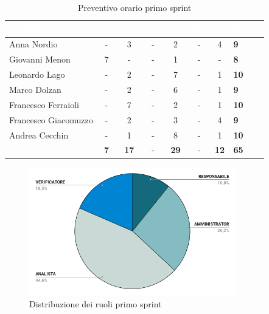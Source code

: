 {
\setlength{\tabcolsep}{10pt}
\renewcommand{\arraystretch}{1.5}
\begin{table}[h!]
    \centering
    \begin{tabularx}{\textwidth}{| l | c | c | c | c | c | c | X |}
        \hline
        \rowcolor{headerrow} \textbf{\textcolor{white}{Membro}} & \textbf{\textcolor{white}{R.}} & \textbf{\textcolor{white}{Am.}} & \textbf{\textcolor{white}{Pj.}} & \textbf{\textcolor{white}{An.}} & \textbf{\textcolor{white}{Pg.}} & \textbf{\textcolor{white}{V.}} & \textbf{\textcolor{white}{Totale}} \\
        \hline
        Anna Nordio & - & 3 & - & 2 & - & 4 & \textbf{9} \\
        \hline
        Giovanni Menon & 7 & - & - & 1 & - & - & \textbf{8} \\
        \hline
        Leonardo Lago & - & 2 & - & 7 & - & 1 & \textbf{10} \\
        \hline
        Marco Dolzan & - & 2 & - & 6 & - & 1 & \textbf{9} \\
        \hline
        Francesco Ferraioli & - & 7 & - & 2 & - & 1 & \textbf{10} \\
        \hline  
        Francesco Giacomuzzo & - & 2 & - & 3 & - & 4 & \textbf{9} \\
        \hline
        Andrea Cecchin & - & 1 & - & 8 & - & 1 & \textbf{10} \\
        \hline
    \cellcolor{headerrow} \textbf{\textcolor{white}{Totale}} & \textbf{7} & \textbf{17} & - & \textbf{29} & - & \textbf{12} & \textbf{65} \\
        \hline
    \end{tabularx} 
    \caption{Preventivo orario primo sprint}
    \label{tab:preventivoorarioprimosprint}
\end{table}
}
{
\begin{figure}[h!]
    \centering
    \includegraphics[width=0.8\textwidth]{prev1ruoli.png}
    \caption{Distribuzione dei ruoli primo sprint}
    \label{fig:preventivootarioprimosprint}
\end{figure}
}

